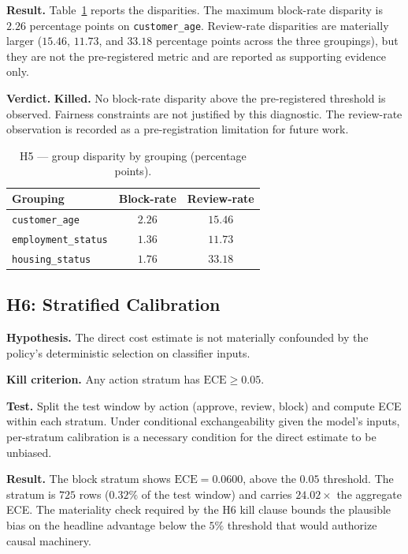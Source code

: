\documentclass[conference]{IEEEtran}
\begin{document}
\textbf{Result.} Table~\ref{tab:h5} reports the disparities. The maximum
block-rate disparity is $2.26$ percentage points on
\texttt{customer\_age}. Review-rate disparities are materially larger
($15.46$, $11.73$, and $33.18$ percentage points across the three
groupings), but they are not the pre-registered metric and are reported as
supporting evidence only.

\textbf{Verdict.} \textbf{Killed.} No block-rate disparity above the
pre-registered threshold is observed. Fairness constraints are not
justified by this diagnostic. The review-rate observation is recorded as a
pre-registration limitation for future work.

\begin{table}[!t]
\caption{H5 — group disparity by grouping (percentage points).}
\label{tab:h5}
\centering
\small
\begin{tabular}{lcc}
\toprule
Grouping & Block-rate & Review-rate \\
\midrule
\texttt{customer\_age}     & $2.26$  & $15.46$ \\
\texttt{employment\_status}& $1.36$  & $11.73$ \\
\texttt{housing\_status}   & $1.76$  & $33.18$ \\
\bottomrule
\end{tabular}
\end{table}

\subsection{H6: Stratified Calibration}

\textbf{Hypothesis.} The direct cost estimate is not materially confounded
by the policy's deterministic selection on classifier inputs.

\textbf{Kill criterion.} Any action stratum has $\text{ECE} \geq 0.05$.

\textbf{Test.} Split the test window by action (approve, review, block) and
compute ECE within each stratum. Under conditional exchangeability given
the model's inputs, per-stratum calibration is a necessary condition for
the direct estimate to be unbiased.

\textbf{Result.} The block stratum shows $\text{ECE} = 0.0600$, above the
$0.05$ threshold. The stratum is $725$ rows ($0.32\%$ of the test window)
and carries $24.02\times$ the aggregate ECE. The materiality check
required by the H6 kill clause bounds the plausible bias on the headline
advantage below the $5\%$ threshold that would authorize causal machinery.
\end{document}
